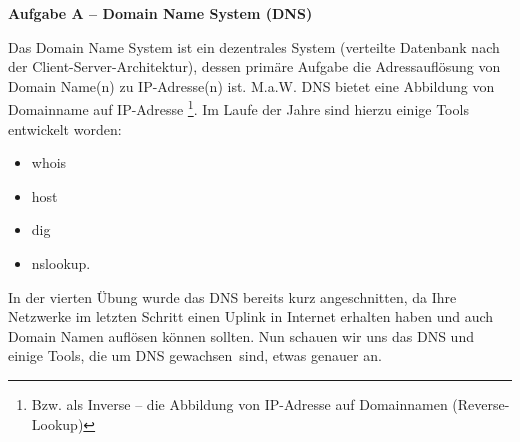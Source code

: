 \documentclass[paper=a4,fontsize=11pt]{scrartcl}%
\numberwithin{equation}{section}
\begin{document}
\begin{center}\Large{\textbf{Aufgabe A -- Domain Name System (DNS)}}\end{center}\vskip0.25in
Das Domain Name System ist ein dezentrales System (verteilte Datenbank nach der Client-Server-Architektur), dessen primäre Aufgabe die Adressauflösung von Domain Name(n) zu IP-Adresse(n) ist. M.a.W. DNS bietet eine Abbildung von Domainname auf IP-Adresse \footnote{Bzw. als Inverse -- die Abbildung von IP-Adresse auf Domainnamen (Reverse-Lookup)}. Im Laufe der Jahre sind hierzu einige Tools entwickelt worden: 
\begin{multicols}{4}
\begin{itemize}
	\item whois 
	\item host
	\item dig
	\item nslookup.
\end{itemize}
\end{multicols}
In der vierten Übung wurde das DNS bereits kurz angeschnitten, da Ihre Netzwerke im letzten Schritt einen Uplink in Internet erhalten haben und auch Domain Namen auflösen können sollten. Nun schauen wir uns das DNS und einige Tools, die um DNS \glqq gewachsen\grqq\ sind, etwas genauer an.
\end{document}
